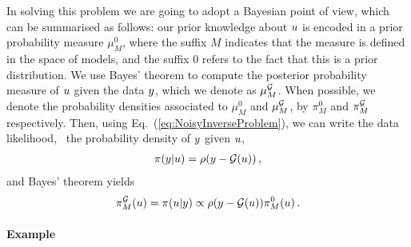 In solving this problem we are going to adopt a Bayesian point of view, which
can be summarised as follows: our prior knowledge about $u$ is encoded
in a prior probability measure $\mu_M^0$, where the suffix $M$ indicates that the measure is defined in the space of models, and the suffix 0 refers to the fact that this is a prior distribution. We use Bayes' theorem to compute
the posterior probability measure of $u$ given the data $y$, which we
denote as $\mu_M^{\mathcal{G}}$. When possible, we denote the probability densities
associated to $\mu_M^0$ and $\mu_M^{\mathcal{G}}$, by $\pi_M^0$ and
$\pi_M^{\mathcal{G}}$ respectively. Then, using Eq.~(\ref{eq:NoisyInverseProblem}),
we can write the data likelihood, \ie\ the probability density of $y$ given
$u$,
\begin{align}
  \label{eq:YGivenUProbDensity}
  \pi(y|u) = \rho(y-\mathcal{G}(u))\, ,
\end{align}
and Bayes' theorem yields
\begin{align}
  \label{eq:BayesThmInversePosterior}
  \pi_M^{\mathcal{G}}(u) = \pi(u|y) \propto \rho(y-\mathcal{G}(u)) \pi_M^0(u)\, .
\end{align}

\paragraph{Example}

